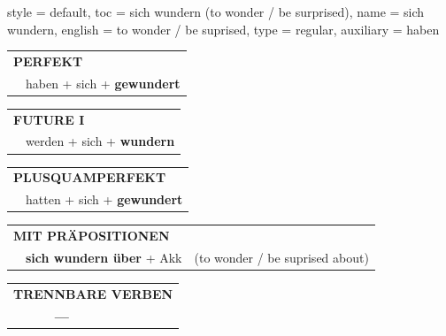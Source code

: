 \begin{verbentry}{
  style = {default},
  toc = {sich wundern (to wonder / be surprised)},
  name = {sich wundern},
  english = {to wonder / be suprised},
  type = {regular},
  auxiliary = {haben}
}
 \begin{tabular}{rl}
     \multicolumn{2}{l}{\textbf{PERFEKT}}\\
    &haben + sich + \textbf{gewundert}\\
  \end{tabular}
\hfill
   \begin{tabular}{rl}
   
    \multicolumn{2}{l}{\textbf{FUTURE I} }\\
    &werden + sich + \textbf{wundern}\\
 
  \end{tabular}
\hfill
   \begin{tabular}{rl}
      \multicolumn{2}{l}{\textbf{PLUSQUAMPERFEKT}}\\
    &hatten + sich + \textbf{gewundert}\\
  \end{tabular}
  
\vspace{10pt}

   \begin{tabular}{lll}
      \multicolumn{3}{l}{\textbf{MIT PRÄPOSITIONEN}}\\
& \textbf{sich wundern über} + Akk & (to wonder / be suprised about)
  \end{tabular}
  \hfill
  \begin{tabular}{lll}
\multicolumn{3}{l}{\textbf{TRENNBARE VERBEN}}\\
& \textbf{---} & \\
\end{tabular}
  
  \vspace{-5pt}
\end{verbentry}

